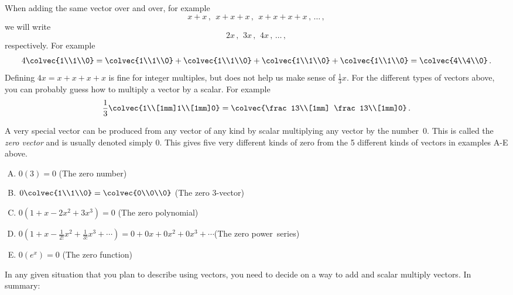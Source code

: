 When adding the same vector over and over, for example
$$
x+x\, ,\: \  x+x+x\, ,\:\    x+x+x+x\,  ,\, \ldots\, ,
$$
we will write
$$
2x\, ,\: \, 3x\, , \:\,  4x\, ,\, \ldots\, ,
$$
respectively. For example
$$
4\colvec{1\\1\\0}=\colvec{1\\1\\0}+\colvec{1\\1\\0}+\colvec{1\\1\\0}+\colvec{1\\1\\0}=\colvec{4\\4\\0}\, .
$$
Defining $4x=x+x+x+x$ is fine for integer multiples, but does not help us make sense of $\frac13 x$. For the different types of vectors 
above, you can probably guess how to multiply a vector by a scalar. For example
$$
\frac 13 \colvec{1\\[1mm]1\\[1mm]0} = \colvec{\frac13\\[1mm] \frac13\\[1mm]0}\, .
$$

 A very special vector can be produced from any vector of any kind by scalar multiplying any vector by the number~$0$. 
This is called the {\it zero vector} and is usually denoted simply $0$. This gives five very different kinds of zero from the 5 different kinds of vectors in   examples A-E above.
\begin{enumerate}[(A)]
\item $0(3)=0$ (The zero number)
\item $0\colvec{1\\1\\0}=\colvec{0\\0\\0} $ (The zero 3-vector)
\item $0\left(1+x-2x^2+3x^3\right)=0$ (The zero polynomial)
\item 
$0\!\left(  1+x\!-\!\frac1{2!}x^2\!+\!\frac1{3!}x^3\!+\cdots \!\right) \!
 =  0+0x+0x^2\!+0x^3\!+\cdots $(The zero power~series)
 \item $0\left(   e^x \right) =0$ (The zero function)
 \end{enumerate}

In any given situation that you plan to describe using vectors, you need to decide on a way to add and scalar multiply vectors.
In summary:
\vspace{3mm}
\begin{center}
\end{center}
\vspace{3mm}

